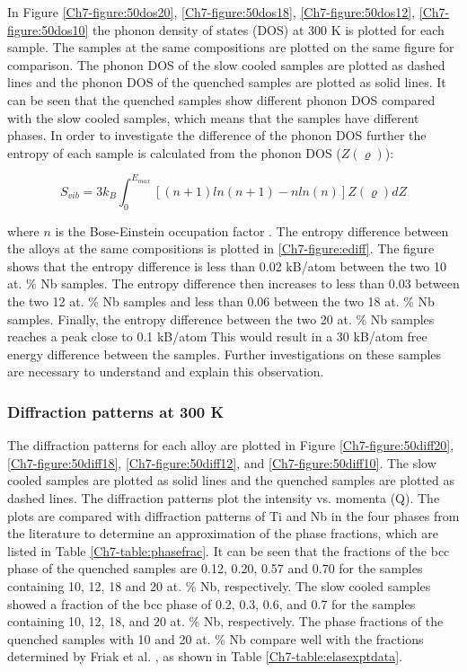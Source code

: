 In Figure \ref{Ch7-figure:50dos20}, \ref{Ch7-figure:50dos18}, \ref{Ch7-figure:50dos12}, \ref{Ch7-figure:50dos10} the phonon density of states (DOS) at 300 K is plotted for each sample. The samples at the same compositions are plotted on the same figure for comparison. The phonon DOS of the slow cooled samples are plotted as dashed lines and the phonon DOS of the quenched samples are plotted as solid lines. It can be seen that the quenched samples show different phonon DOS compared with the slow cooled samples, which means that the samples have different phases. In order to investigate the difference of the phonon DOS further the entropy of each sample is calculated from the phonon DOS ($Z(\varrho)$):

\begin{equation}
\label{eq:phononentropy}
S_{vib} = 3 k_{B} \int_{0}^{E_{max}} \left[ \left( n+1 \right) ln\left(n+1\right) -n ln\left(n\right) \right] Z(\varrho) dZ
\end{equation}

\noindent where $n$ is the Bose-Einstein occupation factor \cite{Budai2014}. The entropy difference between the alloys at the same compositions is plotted in \ref{Ch7-figure:ediff}. The figure shows that the entropy difference is less than 0.02 kB/atom between the two 10 at. \% Nb samples. The entropy difference then increases to less than 0.03 between the two 12 at. \% Nb samples and less than 0.06 between the two 18 at. \% Nb samples. Finally, the entropy difference between the two 20 at. \% Nb samples reaches a peak close to 0.1 kB/atom This would result in a 30 kB/atom free energy difference between the samples. Further investigations on these samples are necessary to understand and explain this observation.

\subsubsection{Diffraction patterns at 300 K}

The diffraction patterns for each alloy are plotted in Figure \ref{Ch7-figure:50diff20}, \ref{Ch7-figure:50diff18}, \ref{Ch7-figure:50diff12}, and \ref{Ch7-figure:50diff10}. The slow cooled samples are plotted as solid lines and the quenched samples are plotted as dashed lines. The diffraction patterns plot the intensity vs. momenta (Q). The plots are compared with diffraction patterns of Ti and Nb in the four phases from the literature to determine an approximation of the phase fractions, which are listed in Table \ref{Ch7-table:phasefrac}. It can be seen that the fractions of the bcc phase of the quenched samples are 0.12, 0.20, 0.57 and 0.70 for the samples containing 10, 12, 18 and 20 at. \% Nb, respectively. The slow cooled samples showed a fraction of the bcc phase of 0.2, 0.3, 0.6, and 0.7 for the samples containing 10, 12, 18, and 20 at. \% Nb, respectively. The phase fractions of the quenched samples with 10 and 20 at. \% Nb compare well with the fractions determined by Friak et al. \cite{Friak2012}, as shown in Table \ref{Ch7-table:elasexptdata}. 

